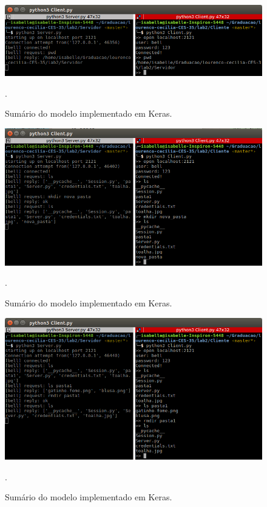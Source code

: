 \documentclass[conference]{IEEEtran}
\begin{document}
\begin{figure}[htbp]
\centering
\centerline{\includegraphics[scale=0.3]{prints/pwd.png}}
\caption{Sumário do modelo implementado em Keras.}.
\label{summary}
\end{figure}

\begin{figure}[htbp]
\centering
\centerline{\includegraphics[scale=0.3]{prints/mkdir1.png}}
\caption{Sumário do modelo implementado em Keras.}.
\label{summary}
\end{figure}

\begin{figure}[htbp]
\centering
\centerline{\includegraphics[scale=0.3]{prints/rmdir1.png}}
\caption{Sumário do modelo implementado em Keras.}.
\label{summary}
\end{figure}
\end{document}
